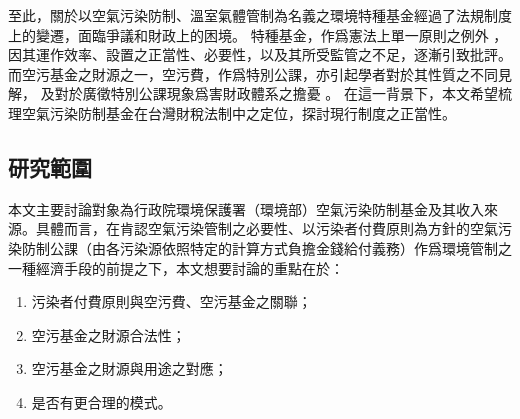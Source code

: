 \documentclass[12pt,a4paper]{article}
\begin{document}
至此，關於以空氣污染防制、溫室氣體管制為名義之環境特種基金經過了法規制度上的變遷，面臨爭議和財政上的困境。
特種基金，作爲憲法上單一原則之例外
，因其運作效率、設置之正當性、必要性，以及其所受監管之不足，逐漸引致批評。而空污基金之財源之一，空污費，作爲特別公課，亦引起學者對於其性質之不同見解，
及對於廣徵特別公課現象爲害財政體系之擔憂
。
在這一背景下，本文希望梳理空氣污染防制基金在台灣財稅法制中之定位，探討現行制度之正當性。





\subsection{研究範圍}

本文主要討論對象為行政院環境保護署（環境部）空氣污染防制基金及其收入來源。具體而言，在肯認空氣污染管制之必要性、以污染者付費原則為方針的空氣污染防制公課（由各污染源依照特定的計算方式負擔金錢給付義務）作爲環境管制之一種經濟手段的前提之下，本文想要討論的重點在於：
\begin{enumerate}[topsep=0.5em, partopsep=0pt, itemsep=0pt, parsep=0pt,leftmargin=3em]
  \item 污染者付費原則與空污費、空污基金之關聯；
  \item 空污基金之財源合法性；
  \item 空污基金之財源與用途之對應；
  \item 是否有更合理的模式。
  \end{enumerate}  
\end{document}
